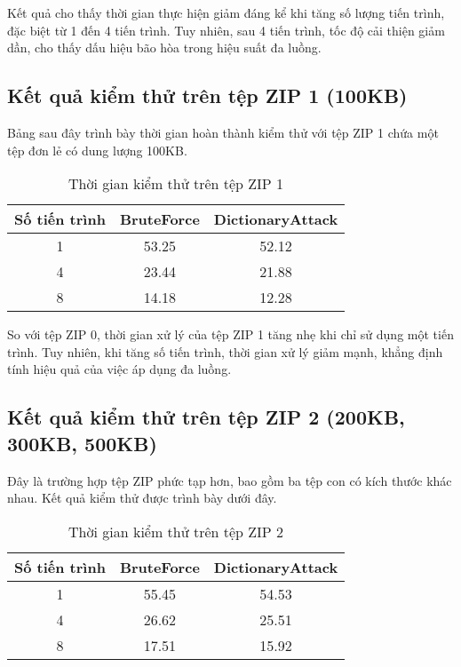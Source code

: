 \documentclass[../DoAn.tex]{subfiles}
\begin{document}
Kết quả cho thấy thời gian thực hiện giảm đáng kể khi tăng số lượng tiến trình, đặc biệt từ 1 đến 4 tiến trình. Tuy nhiên, sau 4 tiến trình, tốc độ cải thiện giảm dần, cho thấy dấu hiệu bão hòa trong hiệu suất đa luồng.

\subsection{Kết quả kiểm thử trên tệp ZIP 1 (100KB)} 

Bảng sau đây trình bày thời gian hoàn thành kiểm thử với tệp ZIP 1 chứa một tệp đơn lẻ có dung lượng 100KB.

\begin{table}[h]
    \centering
    \begin{tabular}{|c|c|c|}
        \toprule
        \textbf{Số tiến trình} & \textbf{BruteForce} & \textbf{DictionaryAttack} \\
        \midrule
        1 & 53.25 & 52.12 \\ \hline 
        4 & 23.44 & 21.88 \\
        8 & 14.18 & 12.28 \\
        \bottomrule \hline
    \end{tabular}
    \caption{Thời gian kiểm thử trên tệp ZIP 1}
    \label{tab:test1}
\end{table}

So với tệp ZIP 0, thời gian xử lý của tệp ZIP 1 tăng nhẹ khi chỉ sử dụng một tiến trình. Tuy nhiên, khi tăng số tiến trình, thời gian xử lý giảm mạnh, khẳng định tính hiệu quả của việc áp dụng đa luồng.

\subsection{Kết quả kiểm thử trên tệp ZIP 2 (200KB, 300KB, 500KB)} 

Đây là trường hợp tệp ZIP phức tạp hơn, bao gồm ba tệp con có kích thước khác nhau. Kết quả kiểm thử được trình bày dưới đây.


\begin{table}[h]
    \centering
    \begin{tabular}{|c|c|c|}
        \toprule
        \textbf{Số tiến trình} & \textbf{BruteForce} & \textbf{DictionaryAttack} \\
        \midrule
        1 & 55.45& 54.53\\ \hline 
        4 & 26.62& 25.51\\
        8 & 17.51& 15.92\\
        \bottomrule \hline
    \end{tabular}
    \caption{Thời gian kiểm thử trên tệp ZIP 2}
    \label{tab:test1}
\end{table}
\end{document}
